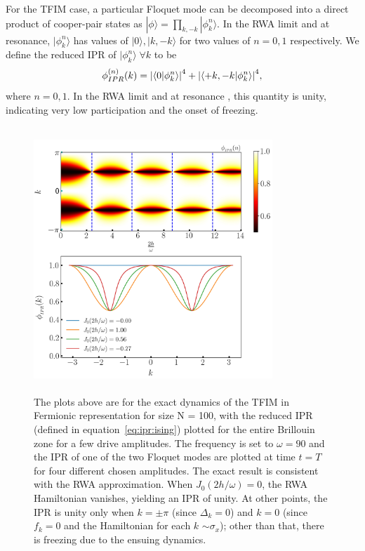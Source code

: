 \documentclass[%
reprint,
superscriptaddress,
amsmath,amssymb,
aps,
prb,
showkeys,
]{revtex4-2}
\begin{document}
	For the TFIM case,  a particular Floquet mode can be decomposed into a direct product of cooper-pair states as $|\phi\rangle = \prod_{k,-k}|\phi^n_k\rangle$. In the RWA limit and at resonance, $|\phi^n_k\rangle$ has values of $|0\rangle, |k,-k\rangle$ for two values of $n=0,1$ respectively. We define the reduced IPR of $|\phi^n_k\rangle\; \forall k$ to be
	\begin{equation}
	\label{eq:ipr:ising}
	\phi^{(n)}_{IPR}(k) = \abs{\ip{0}{\phi^n_k}}^4 + \abs{\ip{ +k, -k }{\phi^n_k}}^4,
	\end{equation}
	where $n=0,1$. In the RWA limit and at resonance , this quantity is unity, indicating very low participation and the onset of freezing.
	\begin{figure}[hbt!]
		\centering
		\includegraphics[height = 10cm, width = 9.0cm]{ising_exact_ipr.jpeg}
		\caption{The plots above are for the exact dynamics of the TFIM in Fermionic representation for size N = 100, with the reduced IPR (defined in equation~\ref{eq:ipr:ising}) plotted for the entire Brillouin zone for a few drive amplitudes. The frequency is set to $\omega = 90$ and the IPR of one of the two Floquet modes are plotted at time $t=T$ for four different chosen amplitudes. The exact result is consistent with the RWA approximation. When $J_0(2h/\omega) = 0$, the RWA Hamiltonian vanishes, yielding an IPR of unity. At other points, the IPR is unity only when $k=\pm \pi$ (since $\Delta_k=0$) and $k=0$ (since $f_k = 0$ and the Hamiltonian for each $k$ $\sim \sigma_x$); other than that, there is freezing due to the ensuing dynamics.}
		\label{fig:ipr:tfim}
	\end{figure}
\end{document}
